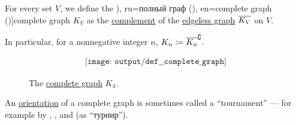 \begin{definition}\label{def:complete_graph}\mimprovised
  For every set \( V \), we define the \term[bg=пълен граф (\cite[12]{Мирчев2001}), ru=полный граф (\cite[16]{Зыков2004}), en=complete graph (\cite[def. 1.3.1]{Knauer2011})]{complete graph} \( K_V \) as the \hyperref[def:graph_complement]{complement} of the \hyperref[def:edgeless_graph]{edgeless graph} \( \oline{K_V} \) on \( V \).

  In particular, for a nonnegative integer \( n \), \( K_n \coloneqq \oline{K_n}^{\complement} \).

  \begin{figure}[!ht]
    \begin{equation}\label{eq:fig:def:complete_graph/k4}
      \begin{aligned}
        \texttt{[image: output/def\_\_complete\_graph]}
      \end{aligned}
    \end{equation}
    \caption{The \hyperref[def:complete_graph]{complete graph} \( K_4 \).}\label{fig:def:complete_graph/k4}
  \end{figure}
\end{definition}
\begin{comments}
  \item An \hyperref[def:graph_orientation]{orientation} of a complete graph is sometimes called a \enquote{tournament} --- for example by , ,  and  (as \enquote{турнир}).
\end{comments}

